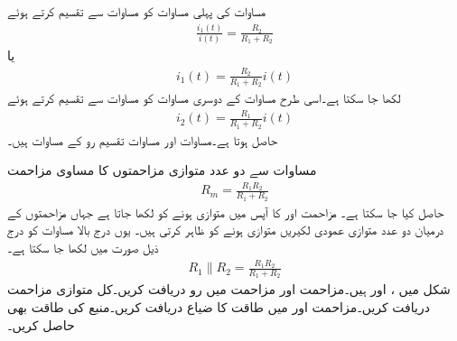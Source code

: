 مساوات  کی پہلی مساوات  کو مساوات  سے تقسیم کرتے ہوئے
\begin{align*}
\frac{i_1(t)}{i(t)}=\frac{R_2}{R_1+R_2}
\end{align*}
یا
\begin{align}\label{مساوات_مزاحمتی_تقسیم_رو_کی_مساوات_الف}
i_1(t)=\frac{R_2}{R_1+R_2} i(t)
\end{align}
لکھا جا سکتا ہے۔اسی طرح مساوات  کے دوسری مساوات  کو مساوات  سے تقسیم کرتے ہوئے
\begin{align}\label{مساوات_مزاحمتی_تقسیم_رو_کی_مساوات_ب}
i_2(t)=\frac{R_1}{R_1+R_2} i(t)
\end{align}
حاصل ہوتا ہے۔مساوات  اور مساوات  تقسیم رو کے مساوات ہیں۔

مساوات  سے دو عدد متوازی مزاحمتوں کا مساوی مزاحمت 
\begin{align}
R_m=\frac{R_1 R_2}{R_1+R_2}
\end{align}
حاصل کیا جا سکتا ہے۔ مزاحمت  اور  کا آپس میں متوازی ہونے کو  لکھا جاتا ہے جہاں مزاحمتوں کے درمیان دو عدد متوازی عمودی لکیریں متوازی ہونے کو ظاہر کرتی ہیں۔ یوں درج بالا مساوات کو درج ذیل صورت میں لکھا جا سکتا ہے۔
\begin{align*}
R_1 \parallel R_2=\frac{R_1 R_2}{R_1+R_2}
\end{align*}
شکل  میں ،  اور  ہیں۔مزاحمت  اور مزاحمت  میں رو دریافت کریں۔کل متوازی مزاحمت دریافت کریں۔مزاحمت  اور  میں طاقت کا ضیاع دریافت کریں۔منبع کی طاقت بھی حاصل کریں۔

